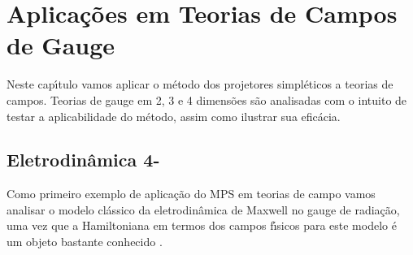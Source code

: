 \documentclass[a4paper,thmsa,12pt]{report}
\begin{document}
\chapter{{\sc Aplica\c c\~oes em Teorias de Campos de Gauge}}

Neste cap\'{\i}tulo vamos aplicar o m\'{e}todo dos projetores
simpl\'{e}ticos a teorias de campos. Teorias de gauge em 2, 3 e 4
dimens\~{o}es s\~{a}o analisadas com o intuito de testar a aplicabilidade do
m\'{e}todo, assim como ilustrar sua efic\'{a}cia.

\section{{\sc Eletrodin\^amica 4-\coordHE{}}}

Como primeiro exemplo de aplica\c{c}\~{a}o do MPS em teorias de campo vamos
analisar o mo\-de\-lo cl\'{a}ssico da eletrodin\^{a}mica de Maxwell no gauge de
radia\c{c}\~{a}o, uma vez que a Hamiltoniana em termos dos campos
f\'{\i}sicos para este modelo \'{e} um objeto bastante conhecido \cite
{sakurai}.
\end{document}
